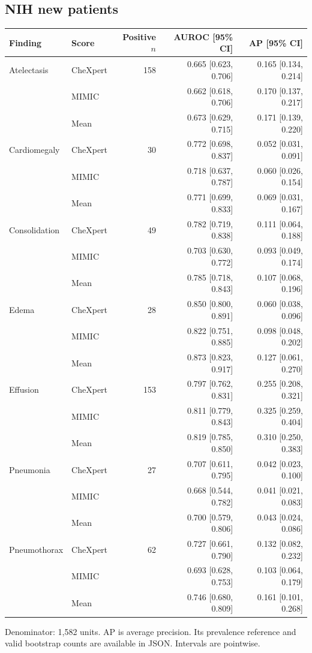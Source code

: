\subsection*{NIH new patients}
\begin{center}\small\setlength{\tabcolsep}{4pt}
\begin{tabular}{llrrr}\toprule
Finding & Score & Positive $n$ & AUROC [95\% CI] & AP [95\% CI]\\\midrule
Atelectasis & CheXpert & 158 & 0.665 [0.623, 0.706] & 0.165 [0.134, 0.214] \\
 & MIMIC &  & 0.662 [0.618, 0.706] & 0.170 [0.137, 0.217] \\
 & Mean &  & 0.673 [0.629, 0.715] & 0.171 [0.139, 0.220] \\
Cardiomegaly & CheXpert & 30 & 0.772 [0.698, 0.837] & 0.052 [0.031, 0.091] \\
 & MIMIC &  & 0.718 [0.637, 0.787] & 0.060 [0.026, 0.154] \\
 & Mean &  & 0.771 [0.699, 0.833] & 0.069 [0.031, 0.167] \\
Consolidation & CheXpert & 49 & 0.782 [0.719, 0.838] & 0.111 [0.064, 0.188] \\
 & MIMIC &  & 0.703 [0.630, 0.772] & 0.093 [0.049, 0.174] \\
 & Mean &  & 0.785 [0.718, 0.843] & 0.107 [0.068, 0.196] \\
Edema & CheXpert & 28 & 0.850 [0.800, 0.891] & 0.060 [0.038, 0.096] \\
 & MIMIC &  & 0.822 [0.751, 0.885] & 0.098 [0.048, 0.202] \\
 & Mean &  & 0.873 [0.823, 0.917] & 0.127 [0.061, 0.270] \\
Effusion & CheXpert & 153 & 0.797 [0.762, 0.831] & 0.255 [0.208, 0.321] \\
 & MIMIC &  & 0.811 [0.779, 0.843] & 0.325 [0.259, 0.404] \\
 & Mean &  & 0.819 [0.785, 0.850] & 0.310 [0.250, 0.383] \\
Pneumonia & CheXpert & 27 & 0.707 [0.611, 0.795] & 0.042 [0.023, 0.100] \\
 & MIMIC &  & 0.668 [0.544, 0.782] & 0.041 [0.021, 0.083] \\
 & Mean &  & 0.700 [0.579, 0.806] & 0.043 [0.024, 0.086] \\
Pneumothorax & CheXpert & 62 & 0.727 [0.661, 0.790] & 0.132 [0.082, 0.232] \\
 & MIMIC &  & 0.693 [0.628, 0.753] & 0.103 [0.064, 0.179] \\
 & Mean &  & 0.746 [0.680, 0.809] & 0.161 [0.101, 0.268] \\
\bottomrule\end{tabular}\end{center}
\noindent Denominator: 1,582 units. AP is average precision. Its prevalence reference and valid bootstrap counts are available in JSON. Intervals are pointwise.
\clearpage
